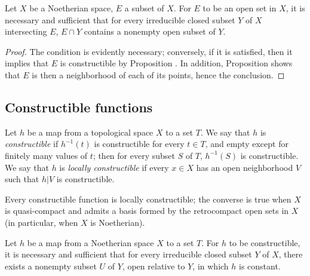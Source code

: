 \begin{corollary}[9.2.6]
\label{0.9.2.6}
Let $X$ be a Noetherian space, $E$ a subset of $X$.
For $E$ to be an open set in $X$, it is necessary and sufficient that for every irreducible closed subset $Y$ of $X$ intersecting $E$, $E\cap Y$ contains a nonempty open subset of $Y$.
\end{corollary}

\begin{proof}
The condition is evidently necessary; conversely, if it is satisfied, then it implies that $E$ is constructible by Proposition .
In addition, Proposition  shows that $E$ is then a neighborhood of each of its points, hence the conclusion.
\end{proof}

\subsection{Constructible functions}
\label{subsection:0.9.3}

\begin{definition}[9.3.1]
\label{0.9.3.1}
Let $h$ be a map from a topological space $X$ to a set $T$.
We say that $h$ is \emph{constructible} if $h^{-1}(t)$ is constructible for every $t\in T$, and empty except for finitely many values of $t$; then for every subset $S$ of $T$, $h^{-1}(S)$ is constructible.
We say that $h$ is \emph{locally constructible} if every $x\in X$ has an open neighborhood $V$ such that $h|V$ is constructible.
\end{definition}

Every constructible function is locally constructible; the converse is true when $X$ is quasi-compact and admits a basis formed by the retrocompact open sets in $X$ (in particular, when $X$ is Noetherian).

\begin{proposition}[9.3.2]
\label{0.9.3.2}
Let $h$ be a map from a Noetherian space $X$ to a set $T$.
For $h$ to be constructible, it is necessary and sufficient that for every irreducible closed subset $Y$ of $X$, there exists a nonempty subset $U$ of $Y$, open relative to $Y$, in which $h$ is constant.
\end{proposition}

